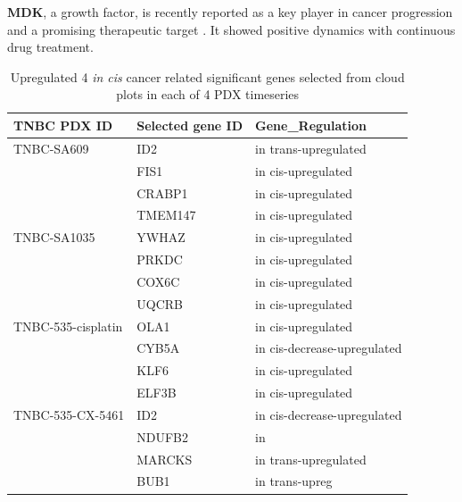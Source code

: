 \textbf{MDK}, a growth factor, is recently reported as a key player in cancer progression and a promising therapeutic target \cite{filippou2020midkine}. It showed positive dynamics with continuous drug treatment. 


\begin{table}[htbp]
   \centering
   \caption{Upregulated 4 \textit{in cis} cancer related significant genes selected from cloud plots in each of 4 PDX timeseries}
     \begin{tabular}{|r|l|l|}
     \hline
     \multicolumn{1}{|l|}{TNBC PDX ID} & Selected gene ID & Gene\_Regulation \\
     \hline
     \multicolumn{1}{|l|}{TNBC-SA609} & ID2 & in trans-upregulated \\
       & FIS1  & in cis-upregulated \\
       & CRABP1  & in cis-upregulated \\
       & TMEM147  & in cis-upregulated \\
     \multicolumn{1}{|l|}{TNBC-SA1035} & YWHAZ & in cis-upregulated  \\
       & PRKDC  & in cis-upregulated \\
       & COX6C  & in cis-upregulated \\
       & UQCRB  & in cis-upregulated \\
     \multicolumn{1}{|l|}{TNBC-535-cisplatin} & OLA1  & in cis-upregulated \\
       & CYB5A  & in cis-decrease-upregulated \\
       & KLF6   & in cis-upregulated \\
       & ELF3B  & in cis-upregulated \\
     \multicolumn{1}{|l|}{TNBC-535-CX-5461} & ID2  & in cis-decrease-upregulated \\
       & NDUFB2 & in  \\
       & MARCKS  & in trans-upregulated \\
       & BUB1  & in trans-upreg \\
       \hline
    \end{tabular}%
  \label{tab:selected4genestable}%
  \end{table}%

























